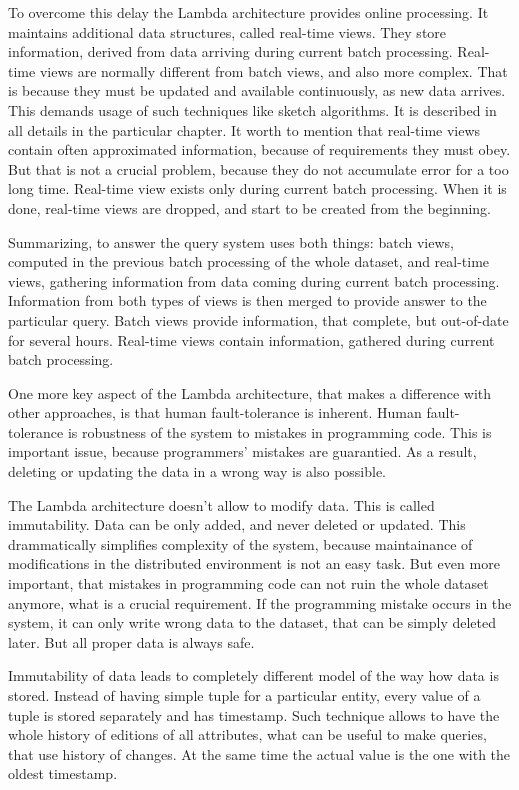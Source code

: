 To overcome this delay the Lambda architecture provides online processing.
It maintains additional data structures, called real-time views.
They store information, derived from data arriving during current batch
processing.
Real-time views are normally different from batch views, and also more complex.
That is because they must be updated and available continuously, as new data
arrives.
This demands usage of such techniques like sketch algorithms.
It is described in all details in the particular chapter.
It worth to mention that real-time views contain often approximated information,
because of requirements they must obey.
But that is not a crucial problem, because they do not accumulate error for a
too long time.
Real-time view exists only during current batch processing.
When it is done, real-time views are dropped, and start to be created from the
beginning.

Summarizing, to answer the query system uses both things: batch views, computed
in the previous batch processing of the whole dataset, and real-time views,
gathering information from data coming during current batch processing.
Information from both types of views is then merged to provide answer to the
particular query.
Batch views provide information, that complete, but out-of-date for
several hours.
Real-time views contain information, gathered during current batch processing.

One more key aspect of the Lambda architecture, that makes a difference with
other approaches, is that human fault-tolerance is inherent.
Human fault-tolerance  is robustness of the
system to mistakes in programming code.
This is important issue, because programmers' mistakes are guarantied.
As a result, deleting or updating the data in a wrong way is also possible.

The Lambda architecture doesn't allow to modify data. This is called
immutability.
Data can be only added, and never deleted or updated.
This drammatically simplifies complexity of the system, because
maintainance of modifications in the distributed environment is not an easy
task.
But even more important, that mistakes in programming code can not ruin the
whole dataset anymore, what is a crucial requirement.
If the programming mistake occurs in the system, it can only write wrong data to
the dataset, that can be simply deleted later.
But all proper data is always safe. 

Immutability of data leads to completely different model of the way how
data is stored.
Instead of having simple tuple for a particular entity, every value of a tuple
is stored separately and has timestamp.
Such technique allows to have the whole history of editions of all attributes,
what can be useful to make queries, that use history of changes.
At the same time the actual value is the one with the oldest timestamp.

